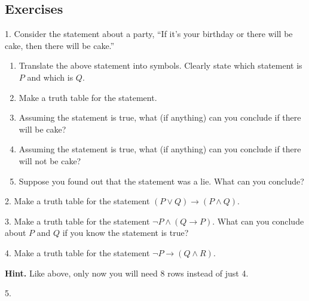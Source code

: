 \documentclass[10pt,]{book}
\theoremstyle{plain}
\theoremstyle{definition}
\theoremstyle{definition}
\theoremstyle{definition}
\theoremstyle{definition}
\numberwithin{equation}{chapter}
\newcommand{\imp}{\rightarrow}
\begin{document}
\subsection[{Exercises}]{Exercises}\label{exercises_sec-logic}
\begin{exerciselist}
\item[1.]\hypertarget{exercise-135}{}\hypertarget{p-1227}{}%
Consider the statement about a party, ``If it's your birthday or there will be cake, then there will be cake.''%
\par
\hypertarget{p-1228}{}%
\leavevmode%
\begin{enumerate}[label=(\alph*)]
\item\hypertarget{li-601}{}\hypertarget{p-1229}{}%
Translate the above statement into symbols. Clearly state which statement is \(P\) and which is \(Q\).%
\item\hypertarget{li-602}{}\hypertarget{p-1230}{}%
Make a truth table for the statement.%
\item\hypertarget{li-603}{}\hypertarget{p-1231}{}%
Assuming the statement is true, what (if anything) can you conclude if there will be cake?%
\item\hypertarget{li-604}{}\hypertarget{p-1232}{}%
Assuming the statement is true, what (if anything) can you conclude if there will not be cake?%
\item\hypertarget{li-605}{}\hypertarget{p-1233}{}%
Suppose you found out that the statement was a lie. What can you conclude?%
\end{enumerate}
%
\par\smallskip
\item[2.]\hypertarget{exercise-136}{}\hypertarget{p-1239}{}%
Make a truth table for the statement \((P \vee Q) \imp (P \wedge Q)\).%
\par\smallskip
\item[3.]\hypertarget{exercise-137}{}\hypertarget{p-1240}{}%
Make a truth table for the statement \(\neg P \wedge (Q \imp P)\). What can you conclude about \(P\) and \(Q\) if you know the statement is true?%
\par\smallskip
\item[4.]\hypertarget{exercise-138}{}\hypertarget{p-1242}{}%
Make a truth table for the statement \(\neg P \imp (Q \wedge R)\).%
\par\smallskip
\par\smallskip%
\noindent\textbf{Hint.}\hypertarget{hint-8}{}\quad%
\hypertarget{p-1243}{}%
Like above, only now you will need 8 rows instead of just 4.%
\item[5.]\hypertarget{exercise-139}{}\hypertarget{p-1244}{}%

\end{exerciselist}
\end{document}
